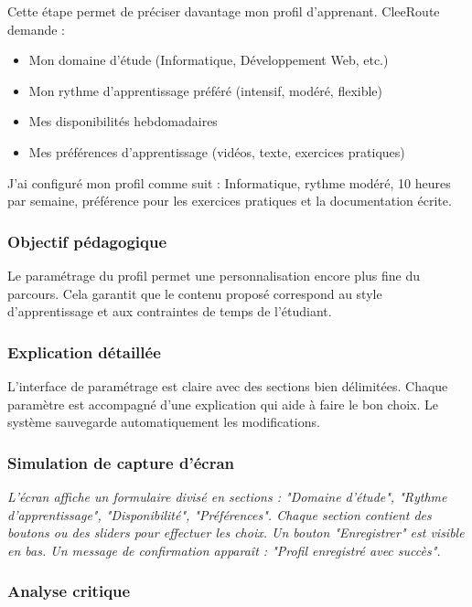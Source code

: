 \documentclass[12pt,a4paper]{article}
\begin{document}
Cette étape permet de préciser davantage mon profil d'apprenant. CleeRoute demande :
\begin{itemize}
    \item Mon domaine d'étude (Informatique, Développement Web, etc.)
    \item Mon rythme d'apprentissage préféré (intensif, modéré, flexible)
    \item Mes disponibilités hebdomadaires
    \item Mes préférences d'apprentissage (vidéos, texte, exercices pratiques)
\end{itemize}

J'ai configuré mon profil comme suit : Informatique, rythme modéré, 10 heures par semaine, préférence pour les exercices pratiques et la documentation écrite.

\subsubsection{Objectif pédagogique}

Le paramétrage du profil permet une personnalisation encore plus fine du parcours. Cela garantit que le contenu proposé correspond au style d'apprentissage et aux contraintes de temps de l'étudiant.

\subsubsection{Explication détaillée}

L'interface de paramétrage est claire avec des sections bien délimitées. Chaque paramètre est accompagné d'une explication qui aide à faire le bon choix. Le système sauvegarde automatiquement les modifications.

\subsubsection{Simulation de capture d'écran}

\textit{L'écran affiche un formulaire divisé en sections : "Domaine d'étude", "Rythme d'apprentissage", "Disponibilité", "Préférences". Chaque section contient des boutons ou des sliders pour effectuer les choix. Un bouton "Enregistrer" est visible en bas. Un message de confirmation apparaît : "Profil enregistré avec succès".}

\subsubsection{Analyse critique}
\end{document}
